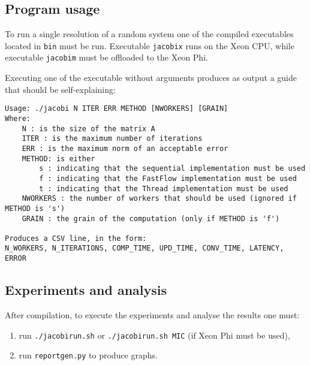 \subsection{Program usage}
To run a single resolution of a random system one of the compiled executables located in \verb|bin| must be run.
Executable \verb|jacobix| runs on the Xeon CPU, while executable \verb|jacobim| must be offloaded to the Xeon Phi.

Executing one of the executable without arguments produces as output a guide that should be self-explaining:
\begin{lstlisting}
Usage: ./jacobi N ITER ERR METHOD [NWORKERS] [GRAIN]
Where: 
	N : is the size of the matrix A
	ITER : is the maximum number of iterations
	ERR : is the maximum norm of an acceptable error
	METHOD: is either
		s : indicating that the sequential implementation must be used
		f : indicating that the FastFlow implementation must be used
		t : indicating that the Thread implementation must be used
	NWORKERS : the number of workers that should be used (ignored if METHOD is 's')
	GRAIN : the grain of the computation (only if METHOD is 'f')

Produces a CSV line, in the form:
N_WORKERS, N_ITERATIONS, COMP_TIME, UPD_TIME, CONV_TIME, LATENCY, ERROR
\end{lstlisting}

\subsection{Experiments and analysis}\label{subsec:runningexperiments}
After compilation, to execute the experiments and analyse the results one must:
\begin{enumerate}
	\item run \verb|./jacobirun.sh| or \verb|./jacobirun.sh MIC| (if Xeon Phi must be used), 
	\item run \verb|reportgen.py| to produce graphs.
\end{enumerate}